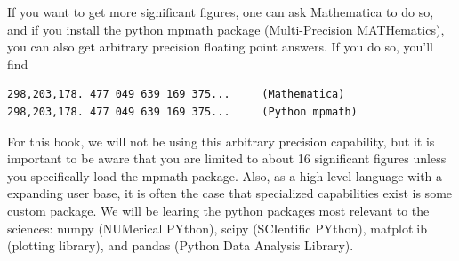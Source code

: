 If you want to get more significant figures, one can ask Mathematica to do so, and if you install the python mpmath package
(Multi-Precision MATHematics), you can also get arbitrary precision floating point answers. If you do so, you'll find
\small\begin{verbatim}
298,203,178. 477 049 639 169 375... 	(Mathematica)
298,203,178. 477 049 639 169 375... 	(Python mpmath)
\end{verbatim}\normalsize
For this book, we will not be using this arbitrary precision capability, but it is important to be aware that you are limited to about 16 significant figures unless you specifically load the mpmath package. Also, as a high level language with a expanding user base, it is often the case that specialized capabilities exist is some custom package. We will be learing the python packages most relevant to the sciences: numpy (NUMerical PYthon), scipy (SCIentific PYthon), matplotlib (plotting library), and pandas (Python Data Analysis Library). 




